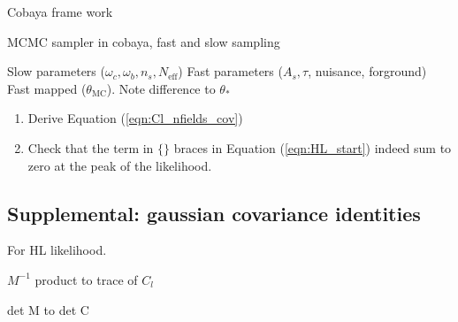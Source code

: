 Cobaya frame work

MCMC sampler in cobaya, fast and slow sampling

Slow parameters ($\omega_c, \omega_b, n_s, N_\textrm{eff}$)
Fast parameters ($A_s, \tau$, nuisance, forground)
Fast mapped ($\theta_\textrm{MC}$).  Note difference to $\theta_*$


\exercises

\begin{enumerate}
\item Derive  Equation  (\ref{eqn:Cl_nfields_cov})

\item Check that the term in $\{\}$ braces in Equation (\ref{eqn:HL_start}) indeed sum to zero at the peak of the likelihood.

  
\end{enumerate}
    
\begin{subappendices}

\section{Supplemental: gaussian covariance identities}\label{app:like_cov_ident}
For HL likelihood.

$M^{-1}$ product to trace of $C_l$

det M to det C

\end{subappendices}

